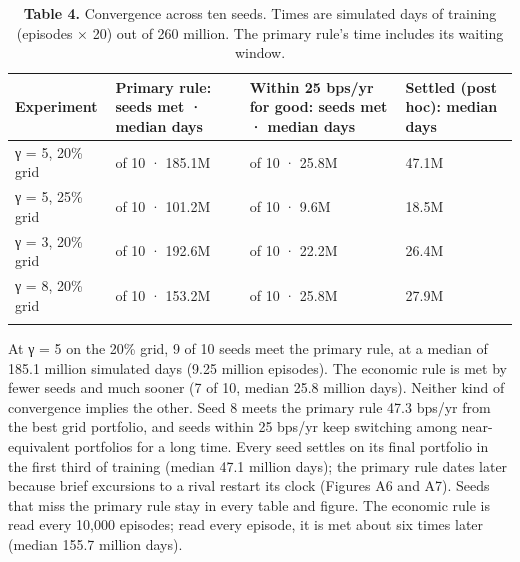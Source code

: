 \documentclass[
  11pt]{article}
\begin{document}
\begin{table}[htbp]
\centering\small
\caption{\textbf{Table 4.} Convergence across ten seeds. Times are
simulated days of training (episodes × 20) out of 260 million. The
primary rule's time includes its waiting window.}
\begin{tabular}{@{}
  >{\raggedright\arraybackslash}p{}
  >{\raggedright\arraybackslash}p{}
  >{\raggedright\arraybackslash}p{}
  >{\raggedright\arraybackslash}p{}@{}}
\toprule\noalign{}
\begin{minipage}[b]{\linewidth}\raggedright
Experiment
\end{minipage} & \begin{minipage}[b]{\linewidth}\raggedright
Primary rule: seeds met · median days
\end{minipage} & \begin{minipage}[b]{\linewidth}\raggedright
Within 25 bps/yr for good: seeds met · median days
\end{minipage} & \begin{minipage}[b]{\linewidth}\raggedright
Settled (post hoc): median days
\end{minipage} \\
\midrule\noalign{}
γ = 5, 20\% grid & 9 of 10 · 185.1M & 7 of 10 · 25.8M & 47.1M \\
γ = 5, 25\% grid & 10 of 10 · 101.2M & 9 of 10 · 9.6M & 18.5M \\
γ = 3, 20\% grid & 8 of 10 · 192.6M & 6 of 10 · 22.2M & 26.4M \\
γ = 8, 20\% grid & 9 of 10 · 153.2M & 7 of 10 · 25.8M & 27.9M \\
\bottomrule\noalign{}
\end{tabular}
\end{table}

At γ = 5 on the 20\% grid, 9 of 10 seeds meet the primary rule, at a
median of 185.1 million simulated days (9.25 million episodes). The
economic rule is met by fewer seeds and much sooner (7 of 10, median
25.8 million days). Neither kind of convergence implies the other. Seed
8 meets the primary rule 47.3 bps/yr from the best grid portfolio, and
seeds within 25 bps/yr keep switching among near-equivalent portfolios
for a long time. Every seed settles on its final portfolio in the first
third of training (median 47.1 million days); the primary rule dates
later because brief excursions to a rival restart its clock (Figures A6
and A7). Seeds that miss the primary rule stay in every table and
figure. The economic rule is read every 10,000 episodes; read every
episode, it is met about six times later (median 155.7 million days).
\end{document}
